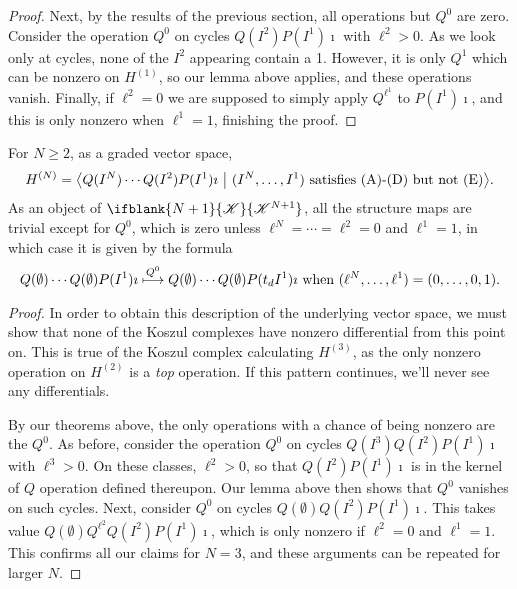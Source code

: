 \documentclass[10pt]{article}
\newcommand{\LL}[1]{\ifblank{#1}{\scrK}{\scrK^{#1}}}
\renewcommand{\Q}{Q}
\begin{document}
\begin{CalculatingRepeatedKoszul}
\begin{proof}
Next, by the results of the previous section, all operations but $\Q^0$ are zero. Consider the operation $Q^0$ on cycles $\Q(I^2)P(I^1)\imath$ with $\ell^2>0$. As we look only at cycles, none of the $I^2$ appearing contain a 1. However, it is only $\Q^1$ which can be nonzero on $H^{(1)}$, so our lemma above applies, and these operations vanish. Finally, if $\ell^2=0$ we are supposed to simply apply $\Q^{\ell^1}$ to $P(I^1)\imath$, and this is only nonzero when $\ell^1=1$, finishing the proof.
\end{proof}

\begin{prop}
For $N\geq2$, as a graded vector space,
\[H^{(N)}={\left\langle \Q(I^N)\cdots \Q(I^2)P(I^1)\imath\ \middle|\  (I^N,\ldots,I^1)\textup{ satisfies \textup{(A)}-\textup{(D)} but not \textup{(E)}}\right\rangle}.\]
As an object of $\LL{N+1}$, all the structure maps are trivial except for $\Q^0$, which is zero unless $\ell^N=\cdots =\ell^2=0$ and $\ell^1=1$, in which case it is given by the formula
\[\Q(\emptyset)\cdots \Q(\emptyset)P(I^1)\imath \overset{\Q^0}{\mapsto} \Q(\emptyset)\cdots \Q(\emptyset)P(t_dI^1)\imath\textup{ when $(\ell^N,\ldots,\ell^1)=(0,\ldots,0,1)$}.\]
\end{prop}
\begin{proof}
In order to obtain this description of the underlying vector space, we must show that none of the Koszul complexes have nonzero differential from this point on. This is true of the Koszul complex calculating $H^{(3)}$, as the only nonzero operation on $H^{(2)}$ is a \emph{top} operation. If this pattern continues, we'll never see any differentials.

By our theorems above, the only operations with a chance of being nonzero are the $Q^0$. As before, consider the operation $Q^0$ on cycles $\Q(I^3)\Q(I^2)P(I^1)\imath$ with $\ell^3>0$. On these classes, $\ell^2>0$, so that $\Q(I^2)P(I^1)\imath$ is in the kernel of $\Q$ operation defined thereupon. Our lemma above then shows that $Q^0$ vanishes on such cycles. Next, consider $\Q^0$ on cycles $\Q(\emptyset)\Q(I^2)P(I^1)\imath$. This takes value $\Q(\emptyset)\Q^{\ell^2}\Q(I^2)P(I^1)\imath$, which is only nonzero if $\ell^2=0$ and $\ell^1=1$. This confirms all our claims for $N=3$, and these arguments can be repeated for larger $N$.
\end{proof}

\end{CalculatingRepeatedKoszul}
\end{document}
